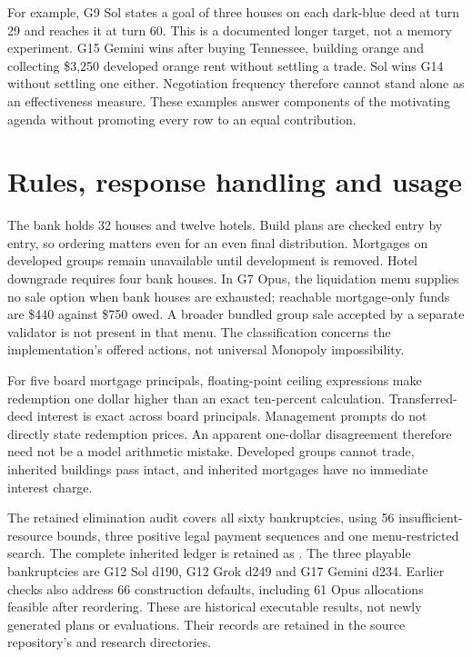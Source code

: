 For example, G9 Sol states a goal of three houses on each dark-blue deed at turn 29 and reaches it at turn 60. This is a documented longer target, not a memory experiment. G15 Gemini wins after buying Tennessee, building orange and collecting \$3,250 developed orange rent without settling a trade. Sol wins G14 without settling one either. Negotiation frequency therefore cannot stand alone as an effectiveness measure. These examples answer components of the motivating agenda without promoting every row to an equal contribution.

\section{Rules, response handling and usage}
\label{app:rules}
The bank holds 32 houses and twelve hotels. Build plans are checked entry by entry, so ordering matters even for an even final distribution. Mortgages on developed groups remain unavailable until development is removed. Hotel downgrade requires four bank houses. In G7 Opus, the liquidation menu supplies no sale option when bank houses are exhausted; reachable mortgage-only funds are \$440 against \$750 owed. A broader bundled group sale accepted by a separate validator is not present in that menu. The classification concerns the implementation's offered actions, not universal Monopoly impossibility.

For five board mortgage principals, floating-point ceiling expressions make redemption one dollar higher than an exact ten-percent calculation. Transferred-deed interest is exact across board principals. Management prompts do not directly state redemption prices. An apparent one-dollar disagreement therefore need not be a model arithmetic mistake. Developed groups cannot trade, inherited buildings pass intact, and inherited mortgages have no immediate interest charge.

The retained elimination audit covers all sixty bankruptcies, using 56 insufficient-resource bounds, three positive legal payment sequences and one menu-restricted search. The complete inherited ledger is retained as . The three playable bankruptcies are G12 Sol d190, G12 Grok d249 and G17 Gemini d234. Earlier checks also address 66 construction defaults, including 61 Opus allocations feasible after reordering. These are historical executable results, not newly generated plans or evaluations. Their records are retained in the source repository's  and  research directories.

